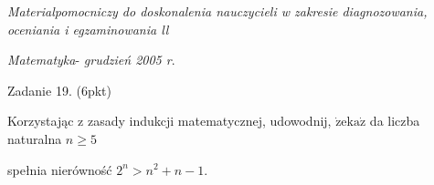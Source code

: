 \documentclass[a4paper,12pt]{article}
\begin{document}
{\it Materialpomocniczy do doskonalenia nauczycieli w zakresie diagnozowania, oceniania i egzaminowania ll}

{\it Matematyka}- {\it grudzień 2005 r}.

Zadanie 19. (6pkt)

Korzystając z zasady indukcji matematycznej, udowodnij, $\dot{\mathrm{z}}\mathrm{e}\mathrm{k}\mathrm{a}\dot{\mathrm{z}}$ da liczba naturalna $n\geq 5$

spełnia nierówność $2^{n}>n^{2}+n-1.$
\end{document}

